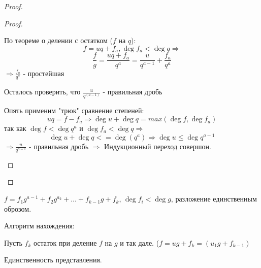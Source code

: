 \begin{theorem}{}
\begin{proof}
\begin{proof}
\begin{description}
 По теореме о делении с остатком ($f$ на $q$):
$$f = uq + f_a, \deg f_a < \deg q \Rightarrow$$
$$\frac{f}{g} = \frac{uq+f_a}{q^a} = \frac{u}{q^{a-1}}+\frac{f_a}{q^a}$$
$\Rightarrow \frac{f_a}{q^a}$ - простейшая

Осталось проверить, что $\frac{u}{q^(a-1)}$  - правильная дробь

Опять применим "трюк" сравнение степеней:
$$u q = f - f_a \Rightarrow \deg u + \deg q = max(\deg f, \deg f_a)$$
так как $\deg f < \deg q^a$ и $\deg f_a < \deg q \Rightarrow$
$$\deg u + \deg q <= \deg (q^a) \Rightarrow \deg u \le \deg q^{a - 1}$$
$\Rightarrow \frac{u}{q^{a-1}}$  - правильная дробь $\Rightarrow$
Индукционный переход совершон. 
\end{description}
\end{proof}
\end{proof}
\end{theorem}

\begin{Rem}
$f = f_1g^{a-1} + f_2 g^{a_2} + \dots + f_{k-1}g + f_k$,
$\deg f_i < \deg g$, разложение единственным оброзом.

Алгоритм нахождения:

Пусть $f_k$ остаток при деление $f$ на $g$ и так дале.
($f = ug + f_k = (u_1g + f_{k-1})$
\end{Rem}

\begin{theorem}{}
Единственность представления.
\end{theorem}

